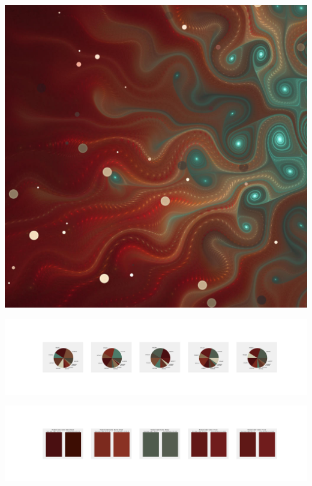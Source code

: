 \documentclass[11pt]{article}
\begin{document}
\begin{landscape}
    \begin{center}
    \includegraphics[width=\textwidth]{./nbimg/file (402).jpg}
    \end{center}

    \begin{center}
    \includegraphics[width=250mm]{./nbimg/pie-337.jpg}
    \end{center}

    \begin{center}
    \includegraphics[width=250mm]{./nbimg/peak-337.jpg}
    \end{center}
    


\end{landscape}
\end{document}
